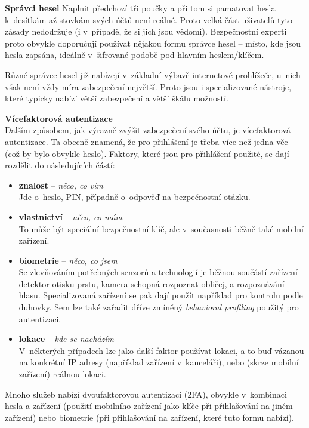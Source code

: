 \textbf{Správci hesel}
Naplnit předchozí tři poučky a při tom si pamatovat hesla k~desítkám až stovkám svých účtů není reálné. Proto velká část uživatelů tyto zásady nedodržuje (i v~případě, že si jich jsou vědomi). Bezpečnostní experti proto obvykle doporučují používat nějakou formu správce hesel -- místo, kde jsou hesla zapsána, ideálně v~šifrované podobě pod hlavním heslem/klíčem.

Různé správce hesel již nabízejí v~základní výbavě internetové prohlížeče, u~nich však není vždy míra zabezpečení největší. Proto jsou i specializované nástroje, které typicky nabízí větší zabezpečení a větší škálu možností.

\textbf{Vícefaktorová autentizace}\\
Dalším způsobem, jak výrazně zvýšit zabezpečení svého účtu, je vícefaktorová autentizace. Ta obecně znamená, že pro přihlášení je třeba více než jedna věc (což by bylo obvykle heslo). Faktory, které jsou pro přihlášení použité, se dají rozdělit do následujících částí:

\begin{itemize}
	\item \textbf{znalost} -- \textit{něco, co vím}\\ 
		Jde o~heslo, PIN, případně o~odpověď na bezpečnostní otázku.
	\item \textbf{vlastnictví} -- \textit{něco, co mám}\\
		To může být speciální bezpečnostní klíč, ale v~současnosti běžně také mobilní zařízení. 
	\item \textbf{biometrie} -- \textit{něco, co jsem}\\
		Se zlevňováním potřebných senzorů a technologií je běžnou součástí zařízení detektor otisku prstu, kamera schopná rozpoznat obličej, a rozpoznávání hlasu. Specializovaná zařízení se pak dají použít například pro kontrolu podle duhovky. Sem lze také zařadit dříve zmíněný \textit{behavioral profiling} použitý pro autentizaci.
	\item \textbf{lokace} -- \textit{kde se nacházím}\\
		V~některých případech lze jako další faktor používat lokaci, a to buď vázanou na konkrétní IP adresy (například zařízení v~kanceláři), nebo (skrze mobilní zařízení) reálnou lokaci.  
\end{itemize} 

Mnoho služeb nabízí dvoufaktorovou autentizaci (2FA), obvykle v~kombinaci hesla a zařízení (použití mobilního zařízení jako klíče při přihlašování na jiném zařízení) nebo biometrie (při přihlašování na zařízení, které tuto formu nabízí).

